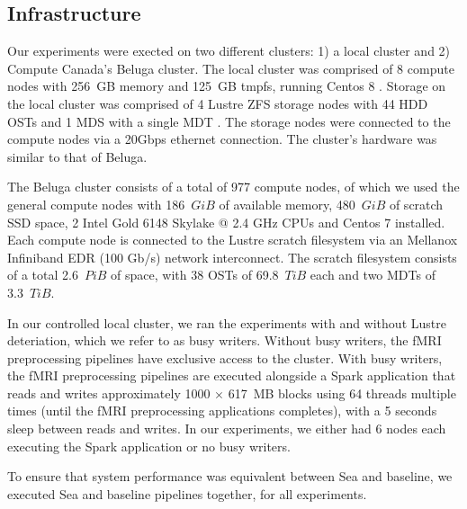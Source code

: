     
    \subsection{Infrastructure}
    

    Our experiments were exected on two different clusters: 1) a local cluster and 2) Compute Canada's Beluga cluster.
    The local cluster was comprised of 8 compute nodes with 256~GB memory and 125~GB tmpfs, running Centos 8 .
     Storage on the local
    cluster was comprised of 4 Lustre ZFS storage nodes with 44 HDD OSTs and 1 MDS with a single MDT . The
    storage nodes were connected to the compute nodes via a 20Gbps ethernet connection.
    The cluster's hardware was similar to that of Beluga.
    
    The Beluga cluster consists of a total of 977 compute nodes, of which we used the  general compute nodes with 186~$GiB$ of available
    memory, 480~$GiB$ of scratch SSD space, 2 Intel Gold 6148 Skylake @ 2.4 GHz CPUs and Centos 7 installed. Each compute node is connected
    to the Lustre scratch filesystem via an Mellanox Infiniband EDR (100 Gb/s) network interconnect. The scratch filesystem consists of a total 2.6~$PiB$
    of space, with 38 OSTs of 69.8~$TiB$ each and two MDTs of 3.3~$TiB$.


    In our controlled local cluster, we ran the experiments with and without Lustre deteriation, which we refer to as busy writers. Without
    busy writers, the fMRI preprocessing pipelines have exclusive access to the cluster. With busy writers, the fMRI preprocessing pipelines are executed alongside
    a Spark application that reads and writes approximately 1000 $\times$ 617~MB blocks using 64 threads multiple times (until the fMRI preprocessing applications completes),
    with a 5 seconds sleep between reads and writes. In our experiments, we either had 6 nodes each executing the Spark application or no busy writers.

    To ensure that system performance was equivalent between Sea and baseline, we executed Sea and baseline pipelines together, for all experiments.
    
